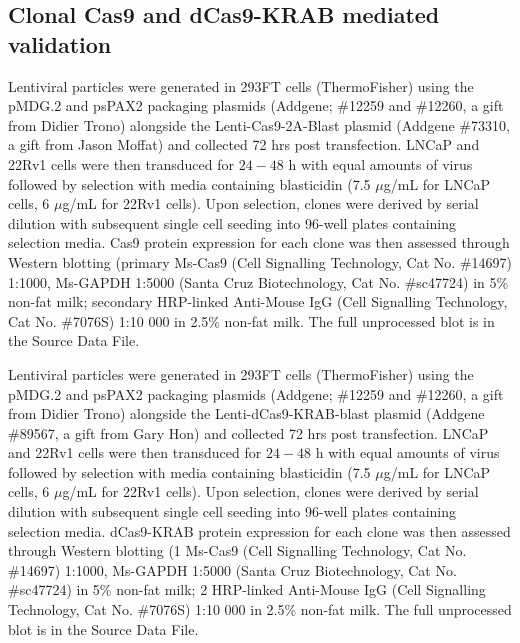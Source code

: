 \subsection{Clonal  Cas9 and dCas9-KRAB mediated validation}

Lentiviral particles were generated in 293FT cells (ThermoFisher) using the pMDG.2 and psPAX2 packaging plasmids (Addgene; \#12259 and \#12260, a gift from Didier Trono) alongside the Lenti-Cas9-2A-Blast plasmid (Addgene \#73310, a gift from Jason Moffat) and collected 72 hrs post transfection.
LNCaP and 22Rv1 cells were then transduced for $24-48$ h with equal amounts of virus followed by selection with media containing blasticidin (7.5 $\mu$g/mL for LNCaP cells, 6 $\mu$g/mL for 22Rv1 cells).
Upon selection, clones were derived by serial dilution with subsequent single cell seeding into 96-well plates containing selection media.
Cas9 protein expression for each clone was then assessed through Western blotting (primary Ms-Cas9 (Cell Signalling Technology, Cat No. \#14697) 1:1000, Ms-GAPDH 1:5000 (Santa Cruz Biotechnology, Cat No. \#sc47724) in 5\% non-fat milk; secondary HRP-linked Anti-Mouse IgG (Cell Signalling Technology, Cat No. \#7076S) 1:10 000 in 2.5\% non-fat milk.
The full unprocessed blot is in the Source Data File.

Lentiviral particles were generated in 293FT cells (ThermoFisher) using the pMDG.2 and psPAX2 packaging plasmids (Addgene; \#12259 and \#12260, a gift from Didier Trono) alongside the Lenti-dCas9-KRAB-blast plasmid (Addgene \#89567, a gift from Gary Hon) and collected 72 hrs post transfection.
LNCaP and 22Rv1 cells were then transduced for $24-48$ h with equal amounts of virus followed by selection with media containing blasticidin (7.5 $\mu$g/mL for LNCaP cells, 6 $\mu$g/mL for 22Rv1 cells).
Upon selection, clones were derived by serial dilution with subsequent single cell seeding into 96-well plates containing selection media.
dCas9-KRAB protein expression for each clone was then assessed through Western blotting (1 \textdegree Ms-Cas9 (Cell Signalling Technology, Cat No. \#14697) 1:1000, Ms-GAPDH 1:5000 (Santa Cruz Biotechnology, Cat No. \#sc47724) in 5\% non-fat milk; 2 \textdegree HRP-linked Anti-Mouse IgG (Cell Signalling Technology, Cat No. \#7076S) 1:10 000 in 2.5\% non-fat milk.
The full unprocessed blot is in the Source Data File.


